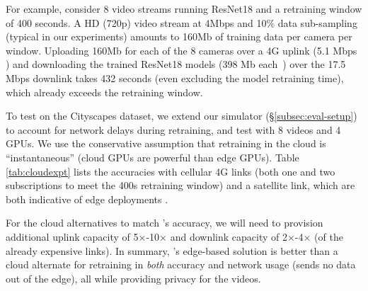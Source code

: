 For example, consider 8 video streams running ResNet18 and a retraining window of 400 seconds. 
A HD (720p) video stream at 4Mbps and 10\% data sub-sampling (typical in our experiments) amounts to 160Mb of training data per camera per window. 
Uploading 160Mb for each of the 8 cameras over a 4G uplink (5.1 Mbps \cite{57-getmobile}) and downloading the trained ResNet18 models (398 Mb each~\cite{torchvision-models}) over the 17.5 Mbps downlink \cite{57-getmobile} takes 432 seconds (even excluding the model retraining time), which already exceeds the retraining window.

To test on the Cityscapes dataset, we extend our simulator (\S\ref{subsec:eval-setup}) to account for network delays during retraining, and test with 8 videos and 4 GPUs. We use the conservative assumption that retraining in the cloud is ``instantaneous'' (cloud GPUs are powerful than edge GPUs). Table \ref{tab:cloudexpt} lists the accuracies with cellular 4G links (both one and two subscriptions to meet the 400s retraining window) and a satellite link, which are both indicative of edge deployments \cite{getmobile}. %

For the cloud alternatives to match {\name}'s accuracy, we will need to provision additional uplink capacity of 5$\times$-10$\times$ and downlink capacity of 2$\times$-4$\times$ (of the already expensive links). In summary, {\name}'s edge-based solution is better than a cloud alternate for retraining in {\em both} accuracy and network usage (\name sends no data out of the edge), all while providing privacy for the videos. 

